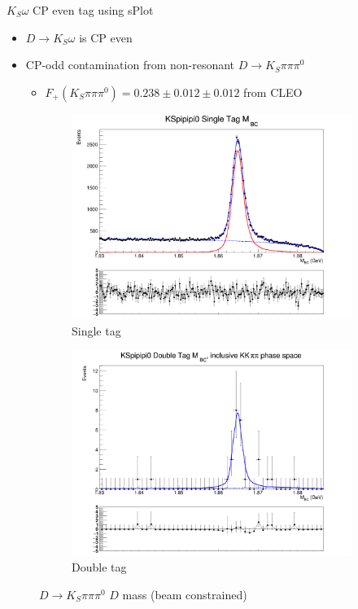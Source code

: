 \documentclass{beamer}
\begin{document}
\begin{frame}{$K_S\omega$ CP even tag using sPlot}
  \begin{itemize}
    \setlength\itemsep{0.5em}
    \item{$D\to K_S\omega$ is CP even}
    \item{CP-odd contamination from non-resonant $D\to K_S\pi\pi\pi^0$}
    \begin{itemize}
      \item{$F_+(K_S\pi\pi\pi^0) = 0.238\pm0.012\pm0.012$ from CLEO}
    \end{itemize}
  \end{itemize}
  \begin{figure}
    \centering
    \vspace{-0.2cm}
    \begin{subfigure}{0.40\textwidth}
      \includegraphics[width = 1.0\textwidth]{Plots/KSpipipi0_SingleTag_MBC_Plot.png}
      \caption{Single tag}
    \end{subfigure}%
    \begin{subfigure}{0.40\textwidth}
      \includegraphics[width = 1.0\textwidth]{Plots/DoubleTagYield_DoubleTag_CP_KKpipi_vs_KSpipipi0_SignalBin0.png}
      \caption{Double tag}
    \end{subfigure}
    \caption{$D\to K_S\pi\pi\pi^0$ $D$ mass (beam constrained)}
  \end{figure}
\end{frame}
\end{document}
